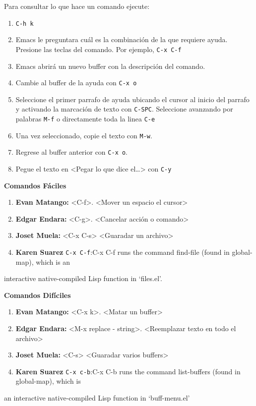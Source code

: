 \documentclass{article}
\begin{document}
Para consultar lo que hace un comando ejecute:
\begin{enumerate}
\item \texttt{C-h k}
\item Emacs le preguntara cuál es la combinación de la que requiere
ayuda. Presione las teclas del comando. Por ejemplo, \texttt{C-x C-f}
\item Emacs abrirá un nuevo buffer con la descripción del comando.
\item Cambie al buffer de la ayuda con \texttt{C-x o}
\item Seleccione el primer parrafo de ayuda ubicando el cursor al inicio
del parrafo y activando la marcación de texto con
\texttt{C-SPC}. Seleccione avanzando por palabras \texttt{M-f} o directamente
toda la linea \texttt{C-e}
\item Una vez seleccionado, copie el texto con \texttt{M-w}.
\item Regrese al buffer anterior con \texttt{C-x o}.
\item Pegue el texto en <Pegar lo que dice el\ldots{}> con \texttt{C-y}
\end{enumerate}

\textbf{\textbf{Comandos Fáciles}}
\begin{enumerate}
\item \textbf{\textbf{Evan Matango:}} <C-f>. <Mover un espacio el cursor>
\item \textbf{\textbf{Edgar Endara:}} <C-g>. <Cancelar acción o comando>
\item \textbf{\textbf{Joset Muela:}}  <C-x C-s> <Guaradar un archivo>
\item \textbf{\textbf{Karen Suarez}} \texttt{C-x C-f}:C-x C-f runs the command find-file (found in global-map), which is an
\end{enumerate}
interactive native-compiled Lisp function in ‘files.el’. 

\textbf{\textbf{Comandos Difíciles}}
\begin{enumerate}
\item \textbf{\textbf{Evan Matango:}} <C-x k>. <Matar un buffer>
\item \textbf{\textbf{Edgar Endara:}} <M-x replace - string>. <Reemplazar texto en todo el archivo>
\item \textbf{\textbf{Joset Muela:}}  <C-s> <Guaradar varios buffers>
\item \textbf{\textbf{Karen Suarez}} \texttt{C-x c-b}:C-x C-b runs the command list-buffers (found in global-map), which is
\end{enumerate}
an interactive native-compiled Lisp function in ‘buff-menu.el’
\end{document}
